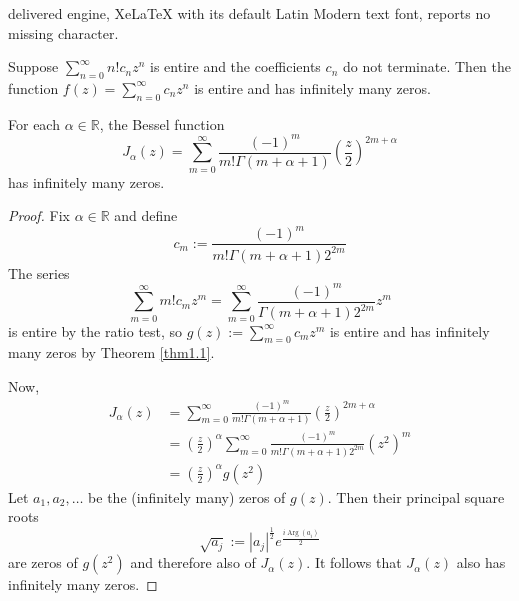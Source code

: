 \documentclass[10pt,a4paper]{amsart}
\newcommand\R{\mathbb{R}}
\begin{document}
delivered engine, XeLaTeX with its default Latin Modern text font, reports no missing character.
    \begin{theorem}\label{thm1.1}
        Suppose $\sum_{n=0}^\infty n!c_n z^n$ is entire and the coefficients $c_n$ do not terminate. Then the function $f(z)=\sum_{n=0}^\infty c_n z^n$ is entire and has infinitely many zeros.
    \end{theorem}

    \begin{theorem}
        For each $\alpha\in\R$, the Bessel function
        $$J_\alpha(z)=\sum_{m=0}^\infty \frac{(-1)^m}{m!\Gamma(m+\alpha+1)}\left(\frac{z}{2}\right)^{2m+\alpha}$$
        has infinitely many zeros.
    \end{theorem}

    \begin{proof}
        Fix $\alpha\in\R$ and define
        $$c_m:=\frac{(-1)^m}{m!\Gamma(m+\alpha+1)2^{2m}}$$
        The series
        $$\sum_{m=0}^\infty m!c_m z^m=\sum_{m=0}^\infty \frac{(-1)^m}{\Gamma(m+\alpha+1)2^{2m}}z^m$$
        is entire by the ratio test, so $g(z):=\sum_{m=0}^\infty c_m z^m$ is entire and has infinitely many zeros by Theorem \ref{thm1.1}.
    
        Now,
        \begin{align*}
            J_\alpha(z) &= \sum_{m=0}^\infty \frac{(-1)^m}{m!\Gamma(m+\alpha+1)}\left(\frac{z}{2}\right)^{2m+\alpha}\\
            &= \left(\frac{z}{2}\right)^\alpha\sum_{m=0}^\infty \frac{(-1)^m}{m!\Gamma(m+\alpha+1)2^{2m}}(z^2)^m\\
            &= \left(\frac{z}{2}\right)^\alpha g(z^2)
        \end{align*}
        Let $a_1,a_2,\dots$ be the (infinitely many) zeros of $g(z)$. Then their principal square roots
        $$\sqrt{a_j}:=|a_j|^{\frac{1}{2}}e^{\frac{i\operatorname{Arg}(a_i)}{2}}$$
        are zeros of $g(z^2)$ and therefore also of $J_\alpha (z)$. It follows that $J_\alpha(z)$ also has infinitely many zeros.
    \end{proof}
\end{document}
